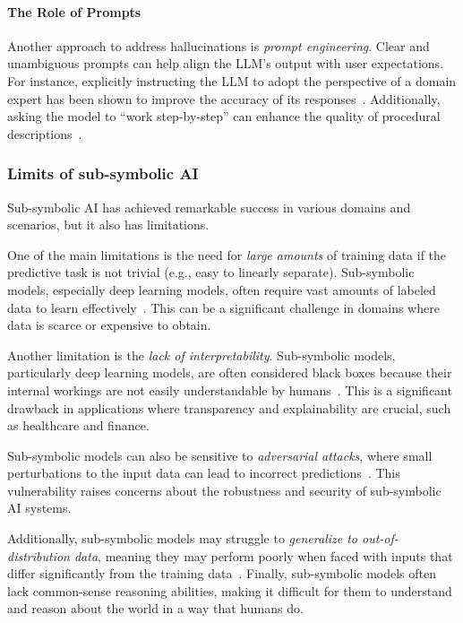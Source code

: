 \paragraph{The Role of Prompts}

Another approach to address hallucinations is \emph{prompt engineering}.
%
Clear and unambiguous prompts can help align the \gls{LLM}'s output with user expectations.
%
For instance, explicitly instructing the \gls{LLM} to adopt the perspective of a domain expert has been shown to improve the accuracy of its responses~\cite{MemmertCB24}.
%
Additionally, asking the model to ``work step-by-step'' can enhance the quality of procedural descriptions~\cite{YangWLLZC23}.


\subsubsection[Limits of sub-symbolic AI]{Limits of sub-symbolic \Gls{AI}}\label{subsubsec:limits-of-sub-symbolic-ai}
%
Sub-symbolic \gls{AI} has achieved remarkable success in various domains and scenarios, but it also has limitations.


One of the main limitations is the need for \emph{large amounts} of training data if the predictive task is not trivial (e.g., easy to linearly separate).
%
Sub-symbolic models, especially deep learning models, often require vast amounts of labeled data to learn effectively~\cite{DBLP:journals/nature/LeCunBH15}.
%
This can be a significant challenge in domains where data is scarce or expensive to obtain.


Another limitation is the \emph{lack of interpretability}.
%
Sub-symbolic models, particularly deep learning models, are often considered black boxes because their internal workings are not easily understandable by humans~\cite{DBLP:journals/natmi/Rudin19,interpretability-lipton-2018}.
%
This is a significant drawback in applications where transparency and explainability are crucial, such as healthcare and finance.


Sub-symbolic models can also be sensitive to \emph{adversarial attacks}, where small perturbations to the input data can lead to incorrect predictions~\cite{DBLP:journals/corr/SzegedyZSBEGF13}.
%
This vulnerability raises concerns about the robustness and security of sub-symbolic \gls{AI} systems.


Additionally, sub-symbolic models may struggle to \emph{generalize to out-of-distribution data}, meaning they may perform poorly when faced with inputs that differ significantly from the training data~\cite{DBLP:conf/icml/RechtRSS19}.
%
Finally, sub-symbolic models often lack common-sense reasoning abilities, making it difficult for them to understand and reason about the world in a way that humans do.


